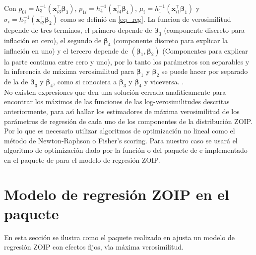Con $p_{0i}=h_3^{-1}(\mathbf{x}_{i3}^{\top} \boldsymbol{\beta}_3)$, $p_{1i}=h_4^{-1}(\mathbf{x}_{i4}^{\top} \boldsymbol{\beta}_4)$, $\mu_i=h_1^{-1}(\mathbf{x}_{i1}^{\top} \boldsymbol{\beta}_1)$ y $\sigma_i=h_2^{-1}(\mathbf{x}_{i2}^{\top} \boldsymbol{\beta}_2)$ como se defini\'{o} en \eqref{eq_reg}. La funcion de verosimilitud depende de tres terminos, el primero depende de $\boldsymbol{\beta}_3$ (componente discreto para inflaci\'{o}n en cero), el segundo de $\boldsymbol{\beta}_4$ (componente discreto para explicar la inflaci\'{o}n en uno) y el tercero depende de $(\boldsymbol{\beta}_1,\boldsymbol{\beta}_2)$ (Componentes para explicar la parte continua entre cero y uno), por lo tanto los par\'{a}metros son separables y la inferencia de m\'{a}xima verosimilitud para $\boldsymbol{\beta}_1$ y $\boldsymbol{\beta}_2$ se puede hacer por separado de la de $\boldsymbol{\beta}_3$ y $\boldsymbol{\beta}_4$, como si conociera a $\boldsymbol{\beta}_3$ y $\boldsymbol{\beta}_4$ y viceversa. \citep{Ospina1}.\\

No existen expresiones que den una soluci\'{o}n cerrada anal\'{\i}ticamente para encontrar los m\'{a}ximos de las funciones de las log-verosimilitudes descritas anteriormente, para as\'{\i} hallar los estimadores de m\'{a}xima verosimilitud de los par\'{a}metros de regresi\'{o}n de cada uno de los componentes de la distribuci\'{o}n ZOIP. Por lo que es necesario utilizar algoritmos de optimizaci\'{o}n no lineal como el m\'{e}todo de Newton-Raphson o Fisher's scoring. Para nuestro caso se usar\'{a} el algoritmo de optimizaci\'{o}n dado por la funci\'{o}n  o  del paquete  de  e implementado en el paquete  de  para el modelo de regresi\'{o}n ZOIP.


\section{Modelo de regresi\'{o}n ZOIP en el paquete }

En esta secci\'{o}n se ilustra como el paquete  realizado en  ajusta un modelo de regresi\'{o}n ZOIP con efectos fijos, v\'{\i}a m\'{a}xima verosimilitud.

%
%

